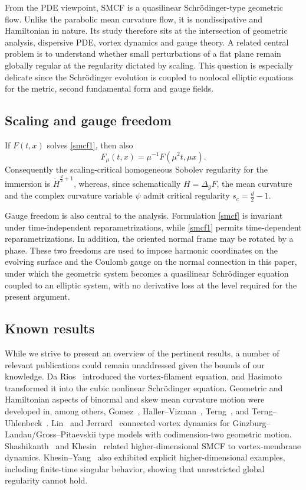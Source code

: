 \documentclass[11pt,letterpaper,reqno]{amsart}
\numberwithin{equation}{section}
\theoremstyle{definition}
\theoremstyle{remark}
\begin{document}
From the PDE viewpoint, SMCF is a quasilinear Schr\"odinger-type geometric flow.
Unlike the parabolic mean curvature flow, it is nondissipative and Hamiltonian in
nature.  Its study therefore sits at the intersection of geometric analysis,
dispersive PDE, vortex dynamics and gauge theory.  A related central problem is to
understand whether small perturbations of a flat plane remain globally regular at
the regularity dictated by scaling.  This question is especially delicate since
the Schr\"odinger evolution is coupled to nonlocal elliptic equations for the
metric, second fundamental form and gauge fields.

\subsection{Scaling and gauge freedom}

If $F(t,x)$ solves \eqref{smcf1}, then also
\[
 F_\mu(t,x)=\mu^{-1}F(\mu^2t,\mu x).
\]
Consequently the scaling-critical homogeneous
Sobolev regularity for the immersion is
 $\dot H^{\frac d2+1}$,
whereas, since schematically $H=\Delta_gF$, the mean curvature and the complex
curvature variable $\psi$ admit critical regularity
 $s_c=\frac d2-1$.


Gauge freedom is also central to the analysis.  Formulation \eqref{smcf} is invariant
under time-independent reparametrizations, while \eqref{smcf1} permits
time-dependent reparametrizations.  In addition, the oriented normal frame may be
rotated by a phase.  These two freedoms are used to impose harmonic coordinates on
the evolving surface and the Coulomb gauge on the normal connection in this paper,  under which the geometric system becomes a quasilinear
Schr\"odinger equation coupled to an elliptic system, with no derivative loss at
the level required for the present argument.

\subsection{Known results}

While we strive to present an overview of the pertinent results, a number of relevant publications could remain unaddressed given the bounds of our knowledge.
Da Rios~\cite{DA} introduced the vortex-filament equation, and
Hasimoto~\cite{Ha72} transformed it into the cubic nonlinear Schr\"odinger
equation. Geometric and Hamiltonian aspects of binormal and skew mean curvature motion
were developed in, among others, Gomez~\cite{Go04}, Haller--Vizman~\cite{HV04},
Terng~\cite{Te15}, and Terng--Uhlenbeck~\cite{TU}. Lin~\cite{Lin98,Lin20} and Jerrard~\cite{Jerrard} connected vortex
dynamics for Ginzburg--Landau/Gross--Pitaevskii type models with codimension-two
geometric motion. Shashikanth~\cite{Sha12} and Khesin~\cite{Khe12} related
higher-dimensional SMCF to vortex-membrane dynamics.  Khesin--Yang~\cite{KY21}
also exhibited explicit higher-dimensional examples, including finite-time
singular behavior, showing that unrestricted global regularity cannot hold.
 
\end{document}
